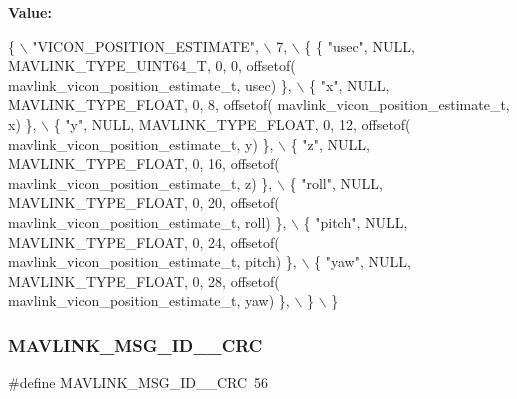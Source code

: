 {\bfseries Value\+:}
\begin{DoxyCode}
\{ \(\backslash\)
    \textcolor{stringliteral}{"VICON\_POSITION\_ESTIMATE"}, \(\backslash\)
    7, \(\backslash\)
    \{  \{ \textcolor{stringliteral}{"usec"}, NULL, MAVLINK_TYPE_UINT64_T, 0, 0, offsetof(
      mavlink_vicon_position_estimate_t, usec) \}, \(\backslash\)
         \{ \textcolor{stringliteral}{"x"}, NULL, MAVLINK_TYPE_FLOAT, 0, 8, offsetof(
      mavlink_vicon_position_estimate_t, x) \}, \(\backslash\)
         \{ \textcolor{stringliteral}{"y"}, NULL, MAVLINK_TYPE_FLOAT, 0, 12, offsetof(
      mavlink_vicon_position_estimate_t, y) \}, \(\backslash\)
         \{ \textcolor{stringliteral}{"z"}, NULL, MAVLINK_TYPE_FLOAT, 0, 16, offsetof(
      mavlink_vicon_position_estimate_t, z) \}, \(\backslash\)
         \{ \textcolor{stringliteral}{"roll"}, NULL, MAVLINK_TYPE_FLOAT, 0, 20, offsetof(
      mavlink_vicon_position_estimate_t, roll) \}, \(\backslash\)
         \{ \textcolor{stringliteral}{"pitch"}, NULL, MAVLINK_TYPE_FLOAT, 0, 24, offsetof(
      mavlink_vicon_position_estimate_t, pitch) \}, \(\backslash\)
         \{ \textcolor{stringliteral}{"yaw"}, NULL, MAVLINK_TYPE_FLOAT, 0, 28, offsetof(
      mavlink_vicon_position_estimate_t, yaw) \}, \(\backslash\)
         \} \(\backslash\)
\}
\end{DoxyCode}
\mbox{\label{mavlink__msg__vicon__position__estimate_8h_a67d568ebe0b03f6fb57153b942712922}} 
\subsubsection{M\+A\+V\+L\+I\+N\+K\+\_\+\+M\+S\+G\+\_\+\+I\+D\+\_\+\_\+\+C\+RC}
{\footnotesize\ttfamily \#define M\+A\+V\+L\+I\+N\+K\+\_\+\+M\+S\+G\+\_\+\+I\+D\+\_\+\_\+\+C\+RC~56}

\mbox{\label{mavlink__msg__vicon__position__estimate_8h_aba96d7b70cb71d199ab9e44c64b204ef}} 
